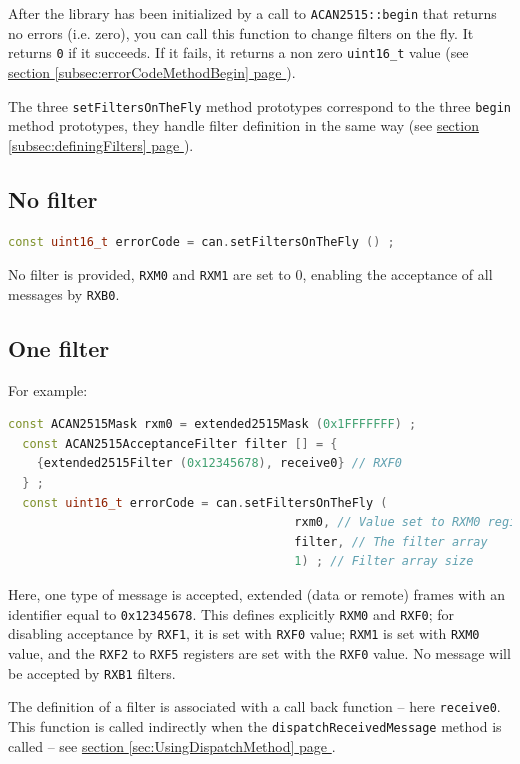 \documentclass[10pt, a4paper, obeyspaces]{extarticle}
\newcommand\refSectionPage[1]{\hyperref[sec:#1]{section \ref*{sec:#1} page \pageref{sec:#1}}}
\newcommand\refSubsectionPage[1]{\hyperref[subsec:#1]{section \ref*{subsec:#1} page \pageref{subsec:#1}}}
\begin{document}
After the library has been initialized by a call to \texttt{ACAN2515::begin} that returns no errors (i.e. zero), you can call this function to change filters on the fly. It returns \texttt{0} if it succeeds. If it fails, it returns a non zero \texttt{uint16\_t} value (see \refSubsectionPage{errorCodeMethodBegin}).

The three \texttt{setFiltersOnTheFly} method prototypes correspond to the three \texttt{begin} method prototypes, they handle filter definition in the same way (see \refSubsectionPage{definingFilters}).

\subsection{No filter}
{ \small\begin{lstlisting}[language=c++]
  const uint16_t errorCode = can.setFiltersOnTheFly () ;
\end{lstlisting}}
No filter is provided, \texttt{RXM0} and \texttt{RXM1} are set to $0$, enabling the acceptance of all messages by \texttt{RXB0}.



\subsection{One filter}

For example:
{ \small\begin{lstlisting}[language=c++]
  const ACAN2515Mask rxm0 = extended2515Mask (0x1FFFFFFF) ;
  const ACAN2515AcceptanceFilter filter [] = {
    {extended2515Filter (0x12345678), receive0} // RXF0
  } ;
  const uint16_t errorCode = can.setFiltersOnTheFly (
                                        rxm0, // Value set to RXM0 register
                                        filter, // The filter array
                                        1) ; // Filter array size
\end{lstlisting}}

Here, one type of message is accepted, extended (data or remote) frames with an identifier equal to \texttt{0x12345678}. This defines explicitly \texttt{RXM0} and \texttt{RXF0}; for disabling acceptance by \texttt{RXF1}, it is set with \texttt{RXF0} value; \texttt{RXM1} is set with \texttt{RXM0} value, and the \texttt{RXF2} to \texttt{RXF5} registers are set with the \texttt{RXF0} value. No message will be accepted by \texttt{RXB1} filters.

The definition of a filter is associated with a call back function -- here \texttt{receive0}. This function is called indirectly when the \texttt{dispatchReceivedMessage} method is called -- see \refSectionPage{UsingDispatchMethod}.
\end{document}
